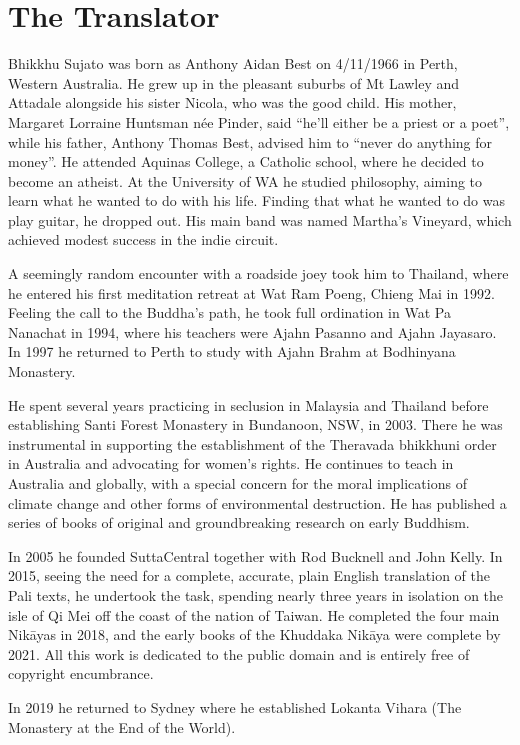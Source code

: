 \documentclass[12pt,openany]{book}%
\begin{document}
\section*{The Translator}

Bhikkhu Sujato was born as Anthony Aidan Best on 4/11/1966 in Perth, Western Australia. He grew up in the pleasant suburbs of Mt Lawley and Attadale alongside his sister Nicola, who was the good child. His mother, Margaret Lorraine Huntsman née Pinder, said “he’ll either be a priest or a poet”, while his father, Anthony Thomas Best, advised him to “never do anything for money”. He attended Aquinas College, a Catholic school, where he decided to become an atheist. At the University of WA he studied philosophy, aiming to learn what he wanted to do with his life. Finding that what he wanted to do was play guitar, he dropped out. His main band was named Martha’s Vineyard, which achieved modest success in the indie circuit. 

A seemingly random encounter with a roadside joey took him to Thailand, where he entered his first meditation retreat at Wat Ram Poeng, Chieng Mai in 1992. Feeling the call to the Buddha’s path, he took full ordination in Wat Pa Nanachat in 1994, where his teachers were Ajahn Pasanno and Ajahn Jayasaro. In 1997 he returned to Perth to study with Ajahn Brahm at Bodhinyana Monastery. 

He spent several years practicing in seclusion in Malaysia and Thailand before establishing Santi Forest Monastery in Bundanoon, NSW, in 2003. There he was instrumental in supporting the establishment of the Theravada bhikkhuni order in Australia and advocating for women’s rights. He continues to teach in Australia and globally, with a special concern for the moral implications of climate change and other forms of environmental destruction. He has published a series of books of original and groundbreaking research on early Buddhism. 

In 2005 he founded SuttaCentral together with Rod Bucknell and John Kelly. In 2015, seeing the need for a complete, accurate, plain English translation of the Pali texts, he undertook the task, spending nearly three years in isolation on the isle of Qi Mei off the coast of the nation of Taiwan. He completed the four main \textsanskrit{Nikāyas} in 2018, and the early books of the Khuddaka \textsanskrit{Nikāya} were complete by 2021. All this work is dedicated to the public domain and is entirely free of copyright encumbrance. 

In 2019 he returned to Sydney where he established Lokanta Vihara (The Monastery at the End of the World). 
\end{document}
